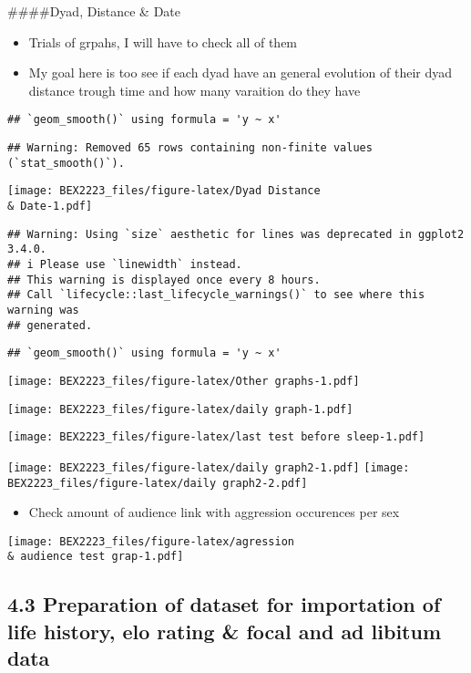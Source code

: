 \documentclass[
]{article}
\providecommand{\tightlist}{%
  \setlength{\itemsep}{0pt}\setlength{\parskip}{0pt}}
\begin{document}
\#\#\#\#Dyad, Distance \& Date

\begin{itemize}
\item
  Trials of grpahs, I will have to check all of them
\item
  My goal here is too see if each dyad have an general evolution of
  their dyad distance trough time and how many varaition do they have
\end{itemize}

\begin{verbatim}
## `geom_smooth()` using formula = 'y ~ x'
\end{verbatim}

\begin{verbatim}
## Warning: Removed 65 rows containing non-finite values (`stat_smooth()`).
\end{verbatim}

\texttt{[image: BEX2223\_files/figure-latex/Dyad Distance \\\& Date-1.pdf]}

\begin{verbatim}
## Warning: Using `size` aesthetic for lines was deprecated in ggplot2 3.4.0.
## i Please use `linewidth` instead.
## This warning is displayed once every 8 hours.
## Call `lifecycle::last_lifecycle_warnings()` to see where this warning was
## generated.
\end{verbatim}

\begin{verbatim}
## `geom_smooth()` using formula = 'y ~ x'
\end{verbatim}

\texttt{[image: BEX2223\_files/figure-latex/Other graphs-1.pdf]}

\texttt{[image: BEX2223\_files/figure-latex/daily graph-1.pdf]}

\texttt{[image: BEX2223\_files/figure-latex/last test before sleep-1.pdf]}

\texttt{[image: BEX2223\_files/figure-latex/daily graph2-1.pdf]}
\texttt{[image: BEX2223\_files/figure-latex/daily graph2-2.pdf]}

\begin{itemize}
\tightlist
\item
  Check amount of audience link with aggression occurences per sex
\end{itemize}

\texttt{[image: BEX2223\_files/figure-latex/agression \\\& audience test grap-1.pdf]}

\hypertarget{preparation-of-dataset-for-importation-of-life-history-elo-rating-focal-and-ad-libitum-data}{%
\subsection{4.3 Preparation of dataset for importation of life history,
elo rating \& focal and ad libitum
data}\label{preparation-of-dataset-for-importation-of-life-history-elo-rating-focal-and-ad-libitum-data}}
\end{document}
